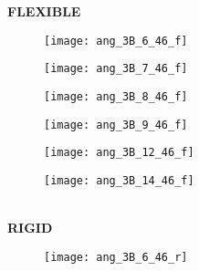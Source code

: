 \documentclass[12pt]{article}
\begin{document}
\begin{figure}[h!]
	\centering
	   \textbf{FLEXIBLE} \\
  \begin{subfigure}[b]{0.15\textwidth}
    \texttt{[image: ang\_3B\_6\_46\_f]}
    \vspace{-15pt} \caption{}
    \label{fig:ang_6_f}
  \end{subfigure}
  \begin{subfigure}[b]{0.15\textwidth}
    \texttt{[image: ang\_3B\_7\_46\_f]}
     \vspace{-15pt} \caption{}
    \label{fig:ang_7_f}
  \end{subfigure}
  \begin{subfigure}[b]{0.15\textwidth}
    \texttt{[image: ang\_3B\_8\_46\_f]}
    \vspace{-15pt} \caption{}
    \label{fig:ang_8_f}
  \end{subfigure}
    \begin{subfigure}[b]{0.15\textwidth}
    \texttt{[image: ang\_3B\_9\_46\_f]}
    \vspace{-15pt} \caption{}
    \label{fig:ang_9_f}
  \end{subfigure}
  \begin{subfigure}[b]{0.15\textwidth}
    \texttt{[image: ang\_3B\_12\_46\_f]}
     \vspace{-15pt} \caption{}
    \label{fig:ang_12_f}
  \end{subfigure}
  \begin{subfigure}[b]{0.15\textwidth}
    \texttt{[image: ang\_3B\_14\_46\_f]}
    \vspace{-15pt} \caption{}
    \label{fig:ang_14_f}
  \end{subfigure} \\     \vspace{-10pt} 
 \textbf{RIGID} \\
  \begin{subfigure}[b]{0.15\textwidth}
    \texttt{[image: ang\_3B\_6\_46\_r]}
     \vspace{-15pt} \caption{}
    \label{fig:ang_6_r}
  \end{subfigure}

\end{figure}
\end{document}
